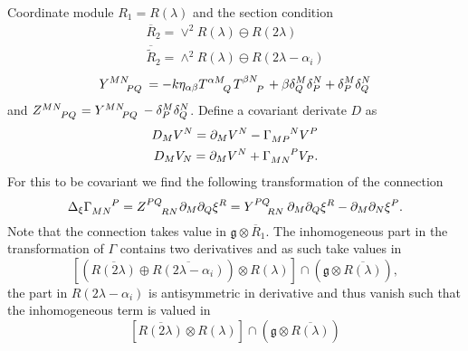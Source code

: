 \documentclass{article}
\begin{document}
Coordinate module $R_1=R(\lambda)$ and the section condition 
\begin{align}
    \overbar{R}_2 = \vee^2 R(\lambda)\ominus R(2\lambda)\\
    \overbar{\tilde{R}}_2 = \wedge^2 R(\lambda)\ominus R(2\lambda-\alpha_i)
\end{align}
\begin{equation}
    \tensor{Y}{^M^N_P_Q} = -k\eta_{\alpha\beta}\tensor{T}{^\alpha^M_Q}\tensor{T}{^\beta^N_P}+\beta\delta^M_Q\delta^N_P+\delta^M_P\delta^N_Q
\end{equation}
and $\tensor{Z}{^M^N_P_Q}=\tensor{Y}{^M^N_P_Q}-\delta^M_P\delta^N_Q$. Define a covariant derivate $D$ as
\begin{align}
    D_M V^N = \pd_MV^N-\tensor{\Gamma}{_M_P^N}V^P\\
    D_M V_N = \pd_MV^N+\tensor{\Gamma}{_M_N^P}V_P.
\end{align}
For this to be covariant we find the following transformation of the connection 
\begin{equation}
    \Delta_\xi\tensor{\Gamma}{_M_N^P} = \tensor{Z}{^P^Q_R_N}\pd_M\pd_Q\xi^R = \tensor{Y}{^P^Q_R_N}\pd_M\pd_Q\xi^R-\pd_M\pd_N\xi^P. 
\end{equation}
Note that the connection takes value in $\mathfrak{g}\otimes \overbar{R}_1$. The inhomogeneous part in the transformation of $\Gamma$ contains two derivatives and as such take values in
\begin{equation}
    \left[\left(\overbar{R(2\lambda)}\oplus \overbar{R(2\lambda-\alpha_i)}\right)\otimes R(\lambda)\right]\cap \left(\mathfrak{g}\otimes\overbar{R(\lambda)}\right),
\end{equation}
the part in $R(2\lambda-\alpha_i)$ is antisymmetric in derivative and thus vanish such that the inhomogeneous term is valued in
\begin{equation}
    \left[\overbar{R(2\lambda)}\otimes R(\lambda)\right]\cap \left(\mathfrak{g}\otimes\overbar{R(\lambda)}\right)
\end{equation}
\end{document}
